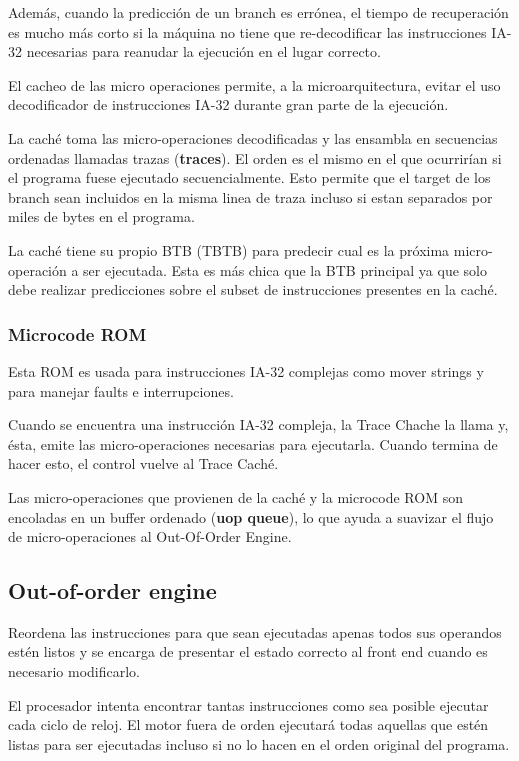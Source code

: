 Además, cuando la predicción de un branch es errónea, el tiempo de recuperación es mucho más corto si la máquina no tiene que re-decodificar las instrucciones IA-32 necesarias para reanudar la ejecución en el lugar correcto.
	
El cacheo de las micro operaciones permite, a la microarquitectura, evitar el uso decodificador de instrucciones IA-32 durante gran parte de la ejecución.
	
La caché toma las micro-operaciones decodificadas y las ensambla en secuencias ordenadas llamadas trazas (\textbf{traces}). El orden es el mismo en el que ocurrirían si el programa fuese ejecutado secuencialmente. Esto permite que el target de los branch sean incluidos en la misma linea de traza incluso si estan separados por miles de bytes en el programa.

La caché tiene su propio BTB (TBTB) para predecir cual es la próxima micro-operación a ser ejecutada. Esta es más chica que la BTB principal ya que solo debe realizar predicciones sobre el subset de instrucciones presentes en la caché.
\subsubsection*{Microcode ROM}
Esta ROM es usada para instrucciones IA-32 complejas como mover strings y para manejar faults e interrupciones.

Cuando se encuentra una instrucción IA-32 compleja, la Trace Chache la llama y, ésta, emite las micro-operaciones necesarias para ejecutarla. Cuando termina de hacer esto, el control vuelve al Trace Caché.

Las micro-operaciones que provienen de la caché y la microcode ROM son encoladas en un buffer ordenado (\textbf{uop queue}), lo que ayuda a suavizar el flujo de micro-operaciones al Out-Of-Order Engine.

\subsection{Out-of-order engine}
Reordena las instrucciones para que sean ejecutadas apenas todos sus operandos estén listos y se encarga de presentar el estado correcto al front end cuando es necesario modificarlo.

El procesador intenta encontrar tantas instrucciones como sea posible ejecutar cada ciclo de reloj. El motor fuera de orden ejecutará todas aquellas que estén listas para ser ejecutadas incluso si no lo hacen en el orden original del programa.

